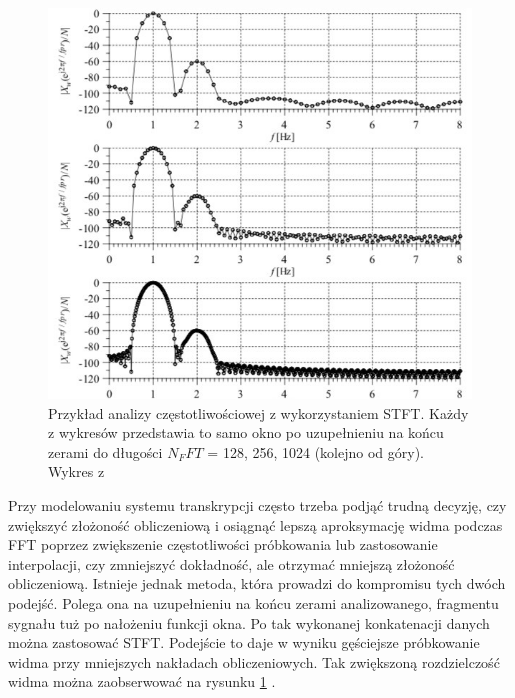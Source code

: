 \documentclass[12pt,a4paper,twoside]{mwart}
\begin{document}
\begin{figure}[t]
  \begin{center}
    \includegraphics[scale=0.7]{images/ZeroPadding.jpg}
    \caption{Przykład analizy częstotliwościowej z wykorzystaniem STFT. Każdy z wykresów przedstawia to samo okno po uzupełnieniu na końcu zerami do długości $N_FFT$ = 128, 256, 1024 (kolejno od góry). Wykres z 
    \cite[224]{CyfrowePrzetwarzanieSygnalowOdTeoriiDoZastosowan}
    }
    \label{fig:ZeroPadding}
  \end{center}
\end{figure}

Przy modelowaniu systemu transkrypcji często trzeba podjąć trudną decyzję, czy zwiększyć złożoność obliczeniową i osiągnąć lepszą aproksymację widma podczas FFT poprzez zwiększenie częstotliwości próbkowania lub zastosowanie interpolacji, czy zmniejszyć dokładność, ale otrzymać mniejszą złożoność obliczeniową. Istnieje jednak metoda, która prowadzi do kompromisu tych dwóch podejść. Polega ona na uzupełnieniu na końcu zerami analizowanego, fragmentu sygnału tuż po nałożeniu funkcji okna. Po tak wykonanej konkatenacji danych można zastosować STFT. Podejście to daje w wyniku gęściejsze próbkowanie widma przy mniejszych nakładach obliczeniowych. Tak zwiększoną rozdzielczość widma można zaobserwować na rysunku \ref{fig:ZeroPadding} 
\cite[221-224]{CyfrowePrzetwarzanieSygnalowOdTeoriiDoZastosowan}
.
\end{document}
